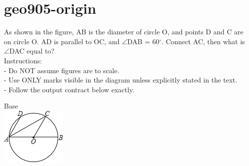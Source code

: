 \documentclass[12pt]{article}
\begin{document}
\section*{geo905-origin}
\noindent\begin{minipage}{\textwidth}
\setlength{\parskip}{4pt}
As shown in the figure, AB is the diameter of circle O, and points D and C are on circle O. AD is parallel to OC, and \ensuremath{\angle }DAB = 60\ensuremath{^\circ}. Connect AC, then what is \ensuremath{\angle }DAC equal to?\\
Instructions:\\
- Do NOT assume figures are to scale.\\
- Use ONLY marks visible in the diagram unless explicitly stated in the text.\\
- Follow the output contract below exactly.\\
\end{minipage}
\begin{center}
\begin{minipage}{0.32\textwidth}\centering
Base\\
\includegraphics[width=0.95\linewidth]{out_rommath_origin/items/geo905-origin/assets/figure.png}
\end{minipage}
\par
\end{center}
\bigskip
\end{document}
